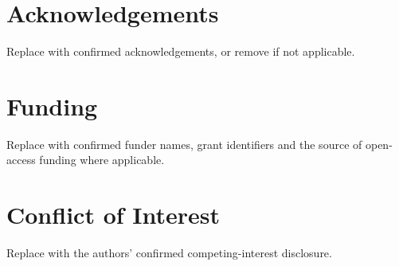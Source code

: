 \documentclass[unnumsec,webpdf,modern,large]{oup-authoring-template}
\begin{document}
\section*{Acknowledgements}
Replace with confirmed acknowledgements, or remove if not applicable.

\section*{Funding}
Replace with confirmed funder names, grant identifiers and the source of
open-access funding where applicable.

\section*{Conflict of Interest}
Replace with the authors' confirmed competing-interest disclosure.



\end{document}
